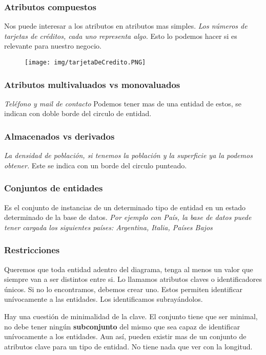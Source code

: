 \subsubsection*{Atributos compuestos}
Nos puede interesar a los atributos en atributos mas simples. \textit{Los números de tarjetas de créditos, cada uno representa algo.} Esto lo podemos hacer si es relevante para nuestro negocio.

\begin{figure}[!htb]
    \centering
    \texttt{[image: img/tarjetaDeCredito.PNG]}
\end{figure}

\subsubsection*{Atributos multivaluados vs monovaluados}
\textit{Teléfono y mail de contacto}
Podemos tener mas de una entidad de estos, se indican con doble borde del circulo de entidad.

\subsubsection*{Almacenados vs derivados}
\textit{La densidad de población, si tenemos la población y la superficie ya la podemos obtener.}
Este se indica con un borde del circulo punteado.

\subsubsection*{Conjuntos de entidades}
Es el conjunto de instancias de un determinado tipo de entidad en un estado determinado de la base de datos. \textit{Por ejemplo con País, la base de datos puede tener cargada los siguientes países: Argentina, Italia, Países Bajos}

\subsubsection*{Restricciones}
Queremos que toda entidad adentro del diagrama, tenga al menos un valor que siempre van a ser distintos entre si. Lo llamamos atributos claves o identificadores únicos. Si no lo encontramos, debemos crear uno. Estos permiten identificar unívocamente a las entidades. Los identificamos subrayándolos.

Hay una cuestión de minimalidad de la clave. El conjunto tiene que ser minimal, no debe tener ningún \textbf{subconjunto} del mismo que sea capaz de identificar unívocamente a los entidades. Aun así, pueden existir mas de un conjunto de atributos clave para un tipo de entidad. No tiene nada que ver con la longitud.

